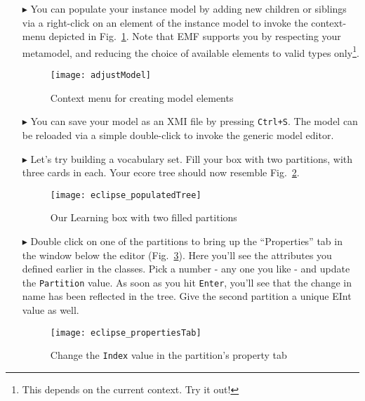 \begin{itemize}
\item[$\blacktriangleright$] You can populate your instance model by adding new children or siblings via a right-click on an element of the instance model to
invoke the context-menu depicted in Fig.~\ref{fig:create_instance}. Note that EMF supports you by respecting your metamodel, and reducing the choice of
available elements to valid types only\footnote{This depends on the current context. Try it out!}.

\begin{figure}[htbp]
	\centering
  \texttt{[image: adjustModel]}
	\caption{Context menu for creating model elements}
	\label{fig:create_instance}
\end{figure}

\item[$\blacktriangleright$] You can save your model as an XMI file by pressing \texttt{Ctrl+S}. The model can be reloaded via a simple double-click to invoke
the generic model editor.

\item[$\blacktriangleright$] Let's try building a vocabulary set. Fill your box with two partitions, with three cards in each. Your ecore tree should now
resemble Fig.~\ref{fig:eclipse_populatedTree}.

\begin{figure}[htbp]
	\centering
  \texttt{[image: eclipse\_populatedTree]}
	\caption{Our Learning box with two filled partitions}
	\label{fig:eclipse_populatedTree}
\end{figure}

\vfill
\pagebreak

\item[$\blacktriangleright$] Double click on one of the partitions to bring up the ``Properties'' tab in the window below the editor
(Fig.~\ref{fig:properties_partition}). Here you'll see the attributes you defined earlier in the classes. Pick a number - any one you like - and update the
\texttt{Partition} value. As soon as you hit \texttt{Enter}, you'll see that the change in name has been reflected in the tree. Give the second partition a
unique EInt value as well.

\vspace{0.5cm}

\begin{figure}[htbp]
	\centering
  \texttt{[image: eclipse\_propertiesTab]}
	\caption{Change the \texttt{Index} value in the partition's property tab}
	\label{fig:properties_partition}
\end{figure}


\end{itemize}
